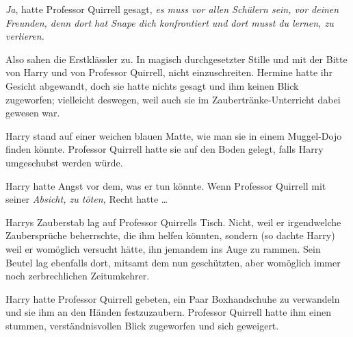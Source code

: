 \later

\emph{Ja}, hatte Professor Quirrell gesagt, \emph{es muss vor allen Schülern sein, vor deinen Freunden, denn dort hat Snape dich konfrontiert und dort musst du lernen, zu verlieren.}

Also sahen die Erstklässler zu. In magisch durchgesetzter Stille und mit der Bitte von Harry und von Professor Quirrell, nicht einzuschreiten. Hermine hatte ihr Gesicht abgewandt, doch sie hatte nichts gesagt und ihm keinen Blick zugeworfen; vielleicht deswegen, weil auch sie im Zaubertränke-Unterricht dabei gewesen war.

Harry stand auf einer weichen blauen Matte, wie man sie in einem Muggel-Dojo finden könnte. Professor Quirrell hatte sie auf den Boden gelegt, falls Harry umgeschubst werden würde.

Harry hatte Angst vor dem, was er tun könnte. Wenn Professor Quirrell mit seiner \emph{Absicht, zu töten,} Recht hatte …

Harrys Zauberstab lag auf Professor Quirrells Tisch. Nicht, weil er irgendwelche Zaubersprüche beherrschte, die ihm helfen könnten, sondern (so dachte Harry) weil er womöglich versucht hätte, ihn jemandem ins Auge zu rammen. Sein Beutel lag ebenfalls dort, mitsamt dem nun geschützten, aber womöglich immer noch zerbrechlichen Zeitumkehrer.

Harry hatte Professor Quirrell gebeten, ein Paar Boxhandschuhe zu verwandeln und sie ihm an den Händen festzuzaubern. Professor Quirrell hatte ihm einen stummen, verständnisvollen Blick zugeworfen und sich geweigert.

